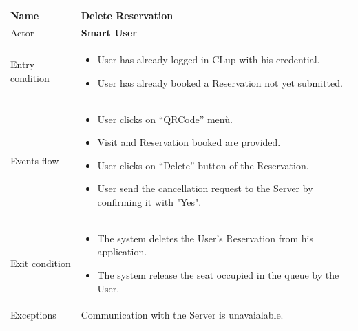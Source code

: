 \begin{tabular}{|p{5cm} | p{7cm} | }
	\hline
	Name & \textbf{Delete Reservation} \\
	\hline
	Actor & \textbf{Smart User} \\
	\hline
	Entry condition &
	\begin{itemize}
		\item User has already logged in CLup with his credential. 
		\item User has already booked a Reservation not yet submitted.
	\end{itemize} \\
	\hline
	Events flow & 
	\begin{itemize}
		\item User clicks on “QRCode” menù.
		\item Visit and Reservation booked are provided.
		\item User clicks on “Delete” button of the Reservation.
		\item User send the cancellation request to the Server by confirming it with "Yes".
	\end{itemize} \\
	\hline
	Exit condition &
	\begin{itemize}	
		\item The system deletes the User's Reservation from his application.
		\item The system release the seat occupied in the queue by the User.
	\end{itemize} \\
	\hline 
	Exceptions & Communication with the Server is unavaialable.\\
	\hline
\end{tabular}

\par \medskip

